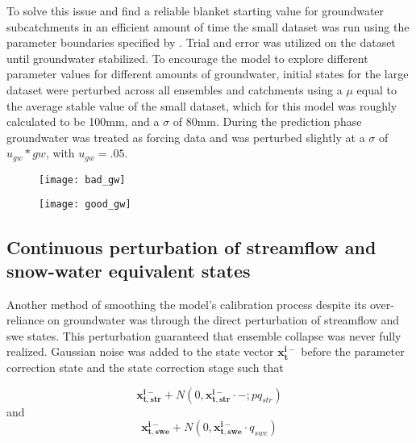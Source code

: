 To solve this issue and find a reliable blanket starting value for groundwater subcatchments in an efficient amount of time the small dataset was run using the parameter boundaries specified by \cite{Maneta2008}. Trial and error was utilized on the dataset until groundwater stabilized. To encourage the model to explore different parameter values for different amounts of groundwater, initial states for the large dataset were perturbed across all ensembles and catchments using a $\mu$ equal to the average stable value of the small dataset, which for this model was roughly calculated to be 100mm, and a $\sigma$ of 80mm. During the prediction phase groundwater was treated as forcing data and was perturbed slightly at a $\sigma$ of $u_{gw} * gw$, with $u_{gw} = .05$.

\begin{figure}
\centering
\begin{minipage}{.5\textwidth}
  \centering
  \texttt{[image: bad\_gw]}
  \label{fig:bad_gw}
\end{minipage}%
\begin{minipage}{.5\textwidth}
  \centering
  \texttt{[image: good\_gw]}
  \label{fig:good_gw}
\end{minipage}
\end{figure}


\subsection{Continuous perturbation of streamflow and snow-water equivalent states}

Another method of smoothing the model's calibration process despite its over-reliance on groundwater was through the direct perturbation of streamflow and swe states. This perturbation guaranteed that ensemble collapse was never fully realized. Gaussian noise was added to the state vector $\mathbf{x^{i-}_{t}}$ before the parameter correction state and the state correction stage such that

\begin{equation}\label{eq:perturbation_str}
\mathbf{x^{i-}_{t,str}} + N(0,\mathbf{x^{i-}_{t,str}} \cdot -;pq_{str})
\end{equation}
and
\begin{equation}\label{eq:perturbation_swe}
\mathbf{x^{i-}_{t,swe}} + N(0,\mathbf{x^{i-}_{t,swe}} \cdot q_{swe})
\end{equation}

